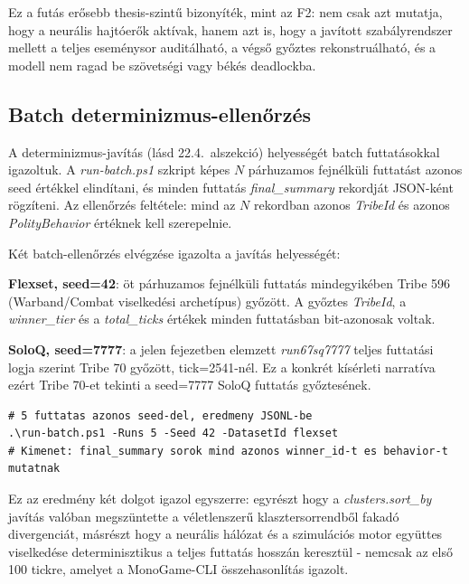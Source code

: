 Ez a futás erősebb thesis-szintű bizonyíték, mint az F2: nem csak azt mutatja, hogy
a neurális hajtóerők aktívak, hanem azt is, hogy a javított szabályrendszer mellett
a teljes eseménysor auditálható, a végső győztes rekonstruálható, és a modell nem
ragad be szövetségi vagy békés deadlockba.

\subsection*{Batch determinizmus-ellenőrzés}

A determinizmus-javítás (lásd 22.4.~alszekció) helyességét batch futtatásokkal igazoltuk. A \textit{run-batch.ps1} szkript képes $N$ párhuzamos fejnélküli futtatást azonos seed értékkel elindítani, és minden futtatás \textit{final\_summary} rekordját JSON-ként rögzíteni. Az ellenőrzés feltétele: mind az $N$ rekordban azonos \textit{TribeId} és azonos \textit{PolityBehavior} értéknek kell szerepelnie.

Két batch-ellenőrzés elvégzése igazolta a javítás helyességét:

\textbf{Flexset, seed=42}: öt párhuzamos fejnélküli futtatás mindegyikében Tribe 596 (Warband/Combat viselkedési archetípus) győzött. A győztes \textit{TribeId}, a \textit{winner\_tier} és a \textit{total\_ticks} értékek minden futtatásban bit-azonosak voltak.

\textbf{SoloQ, seed=7777}: a jelen fejezetben elemzett \textit{run67sq7777} teljes futtatási logja szerint Tribe 70 győzött, tick=2541-nél. Ez a konkrét kísérleti narratíva ezért Tribe 70-et tekinti a seed=7777 SoloQ futtatás győztesének.

\begin{lstlisting}[language={}, caption={Batch determinizmus-ellenőrzés parancssora}]
# 5 futtatas azonos seed-del, eredmeny JSONL-be
.\run-batch.ps1 -Runs 5 -Seed 42 -DatasetId flexset
# Kimenet: final_summary sorok mind azonos winner_id-t es behavior-t mutatnak
\end{lstlisting}

Ez az eredmény két dolgot igazol egyszerre: egyrészt hogy a \textit{clusters.sort\_by} javítás valóban megszüntette a véletlenszerű klasztersorrendből fakadó divergenciát, másrészt hogy a neurális hálózat és a szimulációs motor együttes viselkedése determinisztikus a teljes futtatás hosszán keresztül - nemcsak az első 100 tickre, amelyet a MonoGame-CLI összehasonlítás igazolt.

